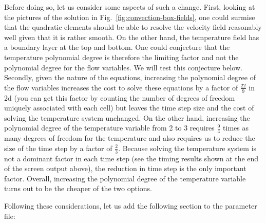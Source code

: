 \documentclass{article}
\begin{document}
Before doing so, let us consider some aspects of such a change. First, looking
at the pictures of the solution in Fig.~\ref{fig:convection-box-fields}, one
could surmise that the quadratic elements should be able to resolve the velocity
field reasonably well given that it is rather smooth. On the other hand, the
temperature field has a boundary layer at the top and bottom. One could
conjecture that the temperature polynomial degree is therefore the limiting
factor and not the polynomial degree for the flow variables. We will test this
conjecture below. Secondly, given the nature of the equations, increasing the
polynomial degree of the flow variables increases the cost to solve these
equations by a factor of $\frac{22}{9}$ in 2d (you can get this factor by
counting the number of degrees of freedom uniquely associated with each cell) but leaves
the time step size and the cost of solving the temperature system unchanged. On
the other hand, increasing the polynomial degree of the temperature variable
from 2 to 3 requires $\frac 94$ times as many degrees of freedom for the
temperature and also requires us to reduce the size of the time step by a factor
of $\frac 23$. Because solving the temperature system is not a dominant factor
in each time step (see the timing results shown at the end of the screen output
above), the reduction in time step is the only important factor. Overall,
increasing the polynomial degree of the temperature variable turns out to be the
cheaper of the two options.

Following these considerations, let us add the following section to the
parameter file:

\end{document}
